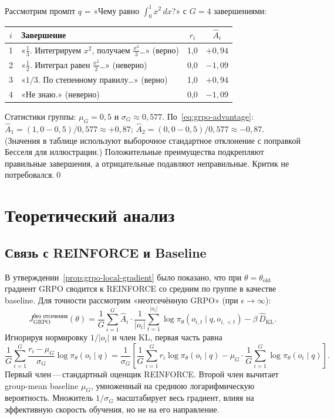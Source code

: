 \begin{example}
\label{ex:grpo-advantage}
Рассмотрим промпт $q$ = «Чему равно $\int_0^1 x^2\,dx$?» с $G = 4$ завершениями:
\begin{center}
{\footnotesize
\begin{tabular}{@{}clcc@{}}
\toprule
$i$ & Завершение & $r_i$ & $\hat{A}_i$ \\
\midrule
1 & «$\frac{1}{3}$. Интегрируем $x^2$, получаем $\frac{x^3}{3}$\ldots» (верно) & 1,0 & $+0{,}94$ \\
2 & «$\frac{1}{2}$. Интеграл равен $\frac{x^2}{2}$\ldots» (неверно) & 0,0 & $-1{,}09$ \\
3 & «$1/3$. По степенному правилу\ldots» (верно) & 1,0 & $+0{,}94$ \\
4 & «Не знаю.» (неверно) & 0,0 & $-1{,}09$ \\
\bottomrule
\end{tabular}
}
\end{center}
Статистики группы: $\mu_G = 0{,}5$ и $\sigma_G \approx 0{,}577$. По~\eqref{eq:grpo-advantage}: $\hat{A}_1 = (1{,}0 - 0{,}5)/0{,}577 \approx +0{,}87$; $\hat{A}_2 = (0{,}0 - 0{,}5)/0{,}577 \approx -0{,}87$. (Значения в таблице используют выборочное стандартное отклонение с поправкой Бесселя для иллюстрации.) Положительные преимущества подкрепляют правильные завершения, а отрицательные подавляют неправильные. Критик не потребовался.\qed
\end{example}

\section{Теоретический анализ}
\label{sec:grpo-theory}

\subsection{Связь с REINFORCE и Baseline}

В утверждении~\ref{prop:grpo-local-gradient} было показано, что при $\theta = \theta_\mathrm{old}$ градиент GRPO сводится к REINFORCE со средним по группе в качестве baseline. Для точности рассмотрим «неотсечённую GRPO» (при $\epsilon \to \infty$):
\begin{equation}
\label{eq:grpo-unclipped}
J_{\mathrm{GRPO}}^{\mbox{без отсечения}}(\theta) = \frac{1}{G}\sum_{i=1}^G \hat{A}_i \cdot \frac{1}{|o_i|}\sum_{t=1}^{|o_i|} \log \pi_\theta(o_{i,t} \mid q, o_{i,<t}) - \beta\, \hat{D}_\mathrm{KL}.
\end{equation}
Игнорируя нормировку $1/|o_i|$ и член KL, первая часть равна
\[
\frac{1}{G}\sum_{i=1}^G \frac{r_i - \mu_G}{\sigma_G} \log \pi_\theta(o_i \mid q)
= \frac{1}{\sigma_G}\left[\frac{1}{G}\sum_{i=1}^G r_i \log \pi_\theta(o_i \mid q) - \mu_G \cdot \frac{1}{G}\sum_{i=1}^G \log \pi_\theta(o_i \mid q)\right].
\]
Первый член\,---\,стандартный оценщик REINFORCE. Второй член вычитает group-mean baseline $\mu_G$, умноженный на среднюю логарифмическую вероятность. Множитель $1/\sigma_G$ масштабирует весь градиент, влияя на эффективную скорость обучения, но не на его направление.

